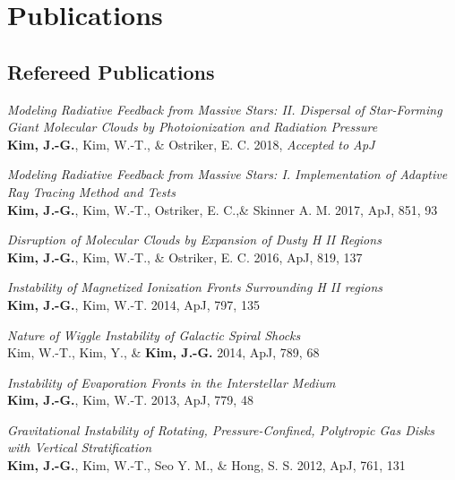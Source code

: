 \section{Publications}

\subsection{Refereed Publications
  \href{http://adsabs.harvard.edu/cgi-bin/nph-abs_connect?library&libname=Jeong-Gyu+Kim&libid=4b3ebd59ff}{\color{dodgerblue}{(ADS Link)}}}

\begin{benumerate}{7}
\item \textit{Modeling Radiative Feedback from Massive Stars: II.
    Dispersal of Star-Forming Giant Molecular Clouds by
    Photoionization and Radiation Pressure} \\
  \textbf{Kim, J.-G.}, Kim, W.-T., \& Ostriker, E. C. 2018,
  \textit{Accepted to ApJ}
\item \textit{Modeling Radiative Feedback from Massive Stars: I.
  Implementation of Adaptive Ray Tracing Method and Tests}\\
\textbf{Kim, J.-G.}, Kim, W.-T., Ostriker, E. C.,\& Skinner A. M.
2017, ApJ, 851, 93
\item \textit{Disruption of Molecular Clouds by Expansion of Dusty H II
  Regions}\\
\textbf{Kim, J.-G.}, Kim, W.-T., \& Ostriker, E. C. 2016, ApJ, 819,
137
\item \textit{Instability of Magnetized Ionization Fronts
  Surrounding H II regions}\\
\textbf{Kim, J.-G.}, Kim, W.-T. 2014, ApJ, 797, 135
\item \textit{Nature of Wiggle Instability of Galactic Spiral
  Shocks}\\
Kim, W.-T., Kim, Y., \& \textbf{Kim, J.-G.} 2014, ApJ, 789, 68
\item \textit{Instability of Evaporation Fronts in the
  Interstellar Medium}\\
\textbf{Kim, J.-G.}, Kim, W.-T. 2013, ApJ, 779, 48
\item \textit{Gravitational Instability of Rotating,
    Pressure-Confined,
    Polytropic Gas Disks with Vertical Stratification} \\
  \textbf{Kim, J.-G.}, Kim, W.-T., Seo Y. M., \& Hong, S. S. 2012,
  ApJ, 761, 131
\end{benumerate}

